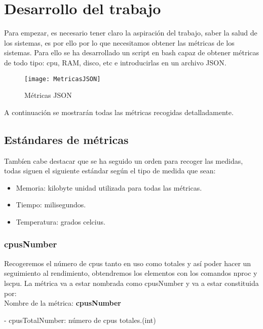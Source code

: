 \documentclass[ spanish, a4paper, 12pt, oneside]{report}
\begin{document}
\chapter{Desarrollo del trabajo}
Para empezar, es necesario tener claro la aspiración del trabajo, saber la salud de los sistemas, es por ello por lo que necesitamos 
obtener las métricas de los sistemas. Para ello se ha desarrollado un script en bash capaz de obtener métricas de todo tipo: cpu, 
RAM, disco, etc e introducirlas en un archivo JSON.\\

\begin{figure}[!h]
   \centering
   \texttt{[image: MetricasJSON]}\\
      \caption{\label{fig: json} Métricas JSON}
\end{figure}

A continuación se mostrarán todas las métricas recogidas detalladamente.\\

\section{Estándares de métricas}

Tambíen cabe destacar que se ha seguido un orden para recoger las medidas, todas siguen el siguiente estándar según el tipo de medida que sean:
\begin{itemize}
   \item Memoria: kilobyte unidad utilizada para todas las métricas.
   \item Tiempo: milisegundos.
   \item Temperatura: grados celcius.
\end{itemize}

\subsection{cpusNumber}
Recogeremos el número de cpus tanto en uso como totales y así poder hacer un seguimiento al rendimiento, obtendremos los elementos con 
los comandos nproc y lscpu. La métrica va a estar nombrada como cpusNumber y va a estar constituida por:\\

Nombre de la métrica: \textbf{cpusNumber}

\hyp{} cpusTotalNumber: número de cpus totales.(int)
\end{document}
